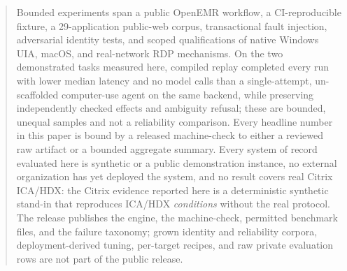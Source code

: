 \documentclass[10pt]{article}
\begin{document}
\begin{abstract}
Bounded experiments span a public OpenEMR
workflow, a CI-reproducible fixture, a 29-application public-web corpus,
transactional fault injection, adversarial identity tests, and scoped
qualifications of native Windows UIA, macOS, and real-network RDP mechanisms.
On the two demonstrated tasks measured here, compiled replay completed every run
with lower median latency and no model calls than a single-attempt,
un-scaffolded computer-use agent on the same backend, while preserving
independently checked effects and ambiguity refusal; these are bounded,
unequal samples and not a reliability comparison.
Every headline
number in this paper is bound by a released machine-check to either a reviewed
raw artifact or a bounded aggregate summary. Every system of record evaluated
here is synthetic or a public demonstration instance, no external organization
has yet deployed the system, and no result covers real Citrix ICA/HDX: the
Citrix evidence reported here is a deterministic synthetic stand-in that
reproduces ICA/HDX \emph{conditions} without the real protocol. The release
publishes the engine,
the machine-check, permitted benchmark files, and the failure taxonomy; grown
identity and reliability corpora, deployment-derived tuning, per-target recipes,
and raw private evaluation rows are not part of the public release.
\end{abstract}













\end{document}
